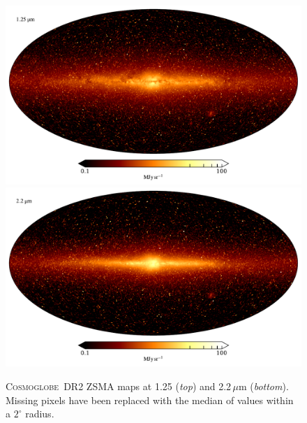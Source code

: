 \documentclass{aa}
\newcommand{\cosmoglobe}{\textsc{Cosmoglobe}}
\begin{document}


\begin{figure}
	\centering
	\includegraphics[width=\linewidth]{figs/map_01.pdf}\\
	\includegraphics[width=\linewidth]{figs/map_02.pdf}
	\caption{\cosmoglobe\ DR2 ZSMA maps at 1.25 (\emph{top}) and
          2.2$\,\mu$m (\emph{bottom}). Missing pixels have been replaced with
          the median of values within a $2^\circ$ radius.}
	\label{fig:freqmaps1_2}
\end{figure}
\end{document}
